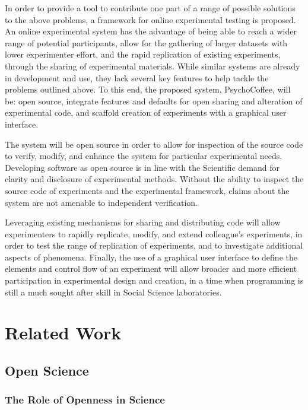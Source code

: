 \documentclass[12pt,a4paper,titlepage]{scrreprt}
\begin{document}
    In order to provide a tool to contribute one part of a range of possible solutions to the above problems, a framework for online experimental testing is proposed. An online experimental system has the advantage of being able to reach a wider range of potential participants, allow for the gathering of larger datasets with lower experimenter effort, and the rapid replication of existing experiments, through the sharing of experimental materials. While similar systems are already in development and use, they lack several key features to help tackle the problems outlined above. To this end, the proposed system, PsychoCoffee, will be: open source, integrate features and defaults for open sharing and alteration of experimental code, and scaffold creation of experiments with a graphical user interface.

    The system will be open source in order to allow for inspection of the source code to verify, modify, and enhance the system for particular experimental needs. Developing software as open source is in line with the Scientific demand for clarity and disclosure of experimental methods. Without the ability to inspect the source code of experiments and the experimental framework, claims about the system are not amenable to independent verification.

    Leveraging existing mechanisms for sharing and distributing code will allow experimenters to rapidly replicate, modify, and extend colleague's experiments, in order to test the range of replication of experiments, and to investigate additional aspects of phenomena. Finally, the use of a graphical user interface to define the elements and control flow of an experiment will allow broader and more efficient participation in experimental design and creation, in a time when programming is still a much sought after skill in Social Science laboratories.

\newpage

\chapter{Related Work}
\section{Open Science}
\subsection{The Role of Openness in Science}
\end{document}
